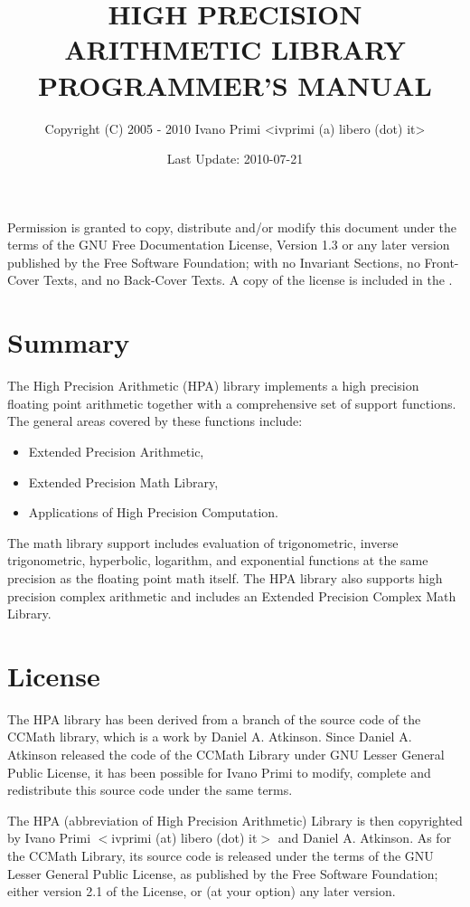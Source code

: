 \documentclass{article}
\title{HIGH PRECISION ARITHMETIC LIBRARY PROGRAMMER'S MANUAL}
\author{Copyright (C) 2005 - 2010 Ivano Primi <ivprimi (a) libero (dot) it> }
\begin{document}
\date{Last Update: 2010-07-21}
\maketitle
\clearpage

\tableofcontents
\clearpage
Permission  is granted to copy, distribute and/or modify this document under 
the terms of the GNU Free Documentation  License,  Version 1.3 or any later 
version published by the   Free   Software  Foundation;  with  no 
Invariant  Sections,  no Front-Cover  Texts,  and no Back-Cover Texts. 
A copy of the license is included in the
.


\hypertarget{toc1}{}
\section{Summary}
The High Precision Arithmetic (HPA) library implements a high
precision floating point arithmetic together with a
comprehensive set of support functions. The general
areas covered by these functions include:

\begin{itemize}
\item Extended Precision Arithmetic,
\item Extended Precision Math Library,
\item Applications of High Precision Computation.
\end{itemize}

The math library support includes evaluation of
trigonometric, inverse trigonometric, hyperbolic,
logarithm, and exponential functions at the same
precision as the floating point math itself.
The HPA library also supports high precision complex 
arithmetic and includes an Extended Precision 
Complex Math Library.


\hypertarget{toc2}{}
\section{License}
The HPA library has been derived 
from a branch of the source code of the CCMath library,
which is a work by Daniel A. Atkinson. 
Since Daniel A. Atkinson released the code of the CCMath Library 
under GNU Lesser General Public License, it has been possible
for Ivano Primi to modify, complete and redistribute this source code 
under the same terms.

The HPA (abbreviation of High Precision Arithmetic) Library is then
copyrighted by Ivano Primi  $<$ivprimi (at) libero (dot) it$>$  and
Daniel A. Atkinson. As for the CCMath Library, its source code
is released under the terms of the GNU Lesser General 
Public License, as published by the Free Software Foundation; 
either version 2.1 of the License, or (at your option) any later version.
\end{document}
